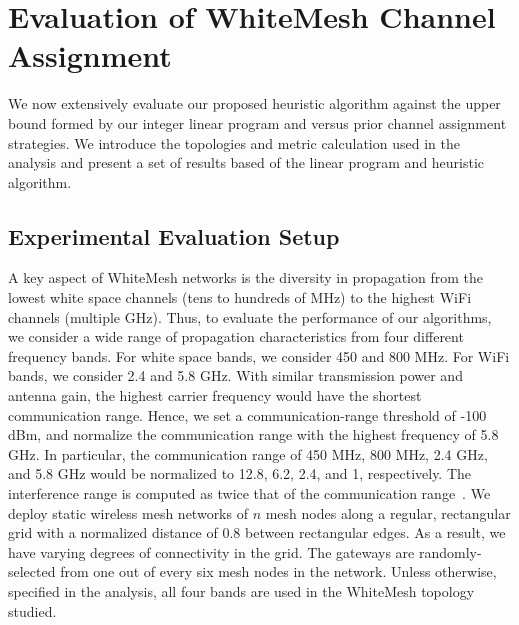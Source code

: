 \section{Evaluation of WhiteMesh Channel Assignment}
\label{sec:experimentdesign}


We now extensively evaluate our proposed heuristic algorithm against the upper 
bound formed by our integer linear program and versus prior channel 
assignment strategies. We introduce the topologies and metric calculation used 
in the analysis and present a set of results based 
of the linear program and heuristic algorithm.




\subsection{Experimental Evaluation Setup}
\label{subsec:design}
A key aspect of WhiteMesh networks is the diversity in propagation from the lowest white
space channels (tens to hundreds of MHz) to the highest WiFi channels (multiple GHz). Thus, 
to evaluate the performance of our algorithms, we consider a wide range of propagation 
characteristics from four different frequency bands.  For white space bands, we consider
450 and 800 MHz.  For WiFi bands, we consider 2.4 and 5.8 GHz.  With similar transmission
power and antenna gain, the highest carrier frequency would have the shortest communication range.
Hence, we set a communication-range threshold of -100 dBm, and normalize the communication 
range with the highest frequency of 5.8 GHz. In particular, the communication range of 
450 MHz, 800 MHz, 2.4 GHz, and 5.8 GHz would be normalized to 12.8, 6.2, 2.4, and 1, respectively.  
The interference range is computed as twice that of the communication 
range~\cite{raniwala2005architecture}. We deploy static wireless mesh networks of $n$ 
mesh nodes along a regular, rectangular grid with a normalized distance of 0.8 between rectangular edges.  As a result, we have varying degrees of connectivity in the grid.
The gateways are randomly-selected from one out of every six mesh nodes in the network.
Unless otherwise, specified in the analysis, all four bands are used in the WhiteMesh
topology studied. 

